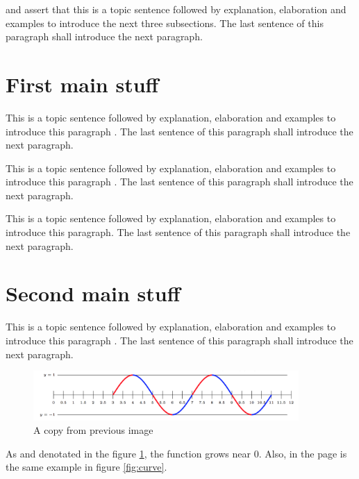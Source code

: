 \citet{Graham2016} and \citet{Grant2016} assert that this is a topic sentence followed by explanation, elaboration and examples to introduce the next three subsections. The last sentence of this paragraph shall introduce the next paragraph. \lipsum[1]

\section{First main stuff}
\label{sec:ch_4_firstmain}

This is a topic sentence followed by explanation, elaboration and examples to introduce this paragraph \citep{Haney2016}. The last sentence of this paragraph shall introduce the next paragraph. \lipsum[1]

This is a topic sentence followed by explanation, elaboration and examples to introduce this paragraph \citep{Jordan2016,Morgan2016}. The last sentence of this paragraph shall introduce the next paragraph. \lipsum[1]

This is a topic sentence followed by explanation, elaboration and examples to introduce this paragraph. The last sentence of this paragraph shall introduce the next paragraph. \lipsum[1]

\section{Second main stuff}
\label{sec:ch_4_secondmain}

This is a topic sentence followed by explanation, elaboration and examples to introduce this paragraph \citep{Scott2016}. The last sentence of this paragraph shall introduce the next paragraph. \lipsum[1]

\begin{figure}[h]
    \centering
    \includegraphics[width=0.9\textwidth]{imageFiles/imageExample}
    \caption{A copy from previous image}
    \label{fig:copycurve}
\end{figure}
 
As \citet{Wells2016} and \citet{Williamson2016} denotated in the figure \ref{fig:copycurve}, the 
function grows near 0. Also, in the page \pageref{fig:curve} 
is the same example in figure \ref{fig:curve}.

